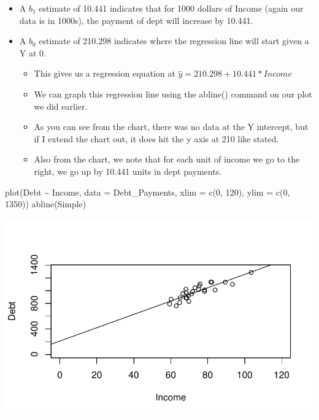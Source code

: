 \documentclass[
  letterpaper,
  DIV=11,
  numbers=noendperiod]{scrreprt}
\newenvironment{Shaded}{\begin{snugshade}}{\end{snugshade}}
\newcommand{\AttributeTok}[1]{\textcolor[rgb]{0.40,0.45,0.13}{#1}}
\newcommand{\DecValTok}[1]{\textcolor[rgb]{0.68,0.00,0.00}{#1}}
\newcommand{\FunctionTok}[1]{\textcolor[rgb]{0.28,0.35,0.67}{#1}}
\newcommand{\NormalTok}[1]{\textcolor[rgb]{0.00,0.23,0.31}{#1}}
\newcommand{\SpecialCharTok}[1]{\textcolor[rgb]{0.37,0.37,0.37}{#1}}
\providecommand{\tightlist}{%
  \setlength{\itemsep}{0pt}\setlength{\parskip}{0pt}}\usepackage{longtable,booktabs,array}
\begin{document}
\begin{itemize}
\tightlist
\item
  A \(b_1\) estimate of 10.441 indicates that for 1000 dollars of Income
  (again our data is in 1000s), the payment of dept will increase by
  10.441.
\item
  A \(b_0\) estimate of 210.298 indicates where the regression line will
  start given a Y at 0.

  \begin{itemize}
  \tightlist
  \item
    This gives us a regression equation at
    \(\hat{y} = 210.298 + 10.441*Income\)
  \item
    We can graph this regression line using the abline() command on our
    plot we did earlier.
  \item
    As you can see from the chart, there was no data at the Y intercept,
    but if I extend the chart out, it does hit the y axis at 210 like
    stated.
  \item
    Also from the chart, we note that for each unit of income we go to
    the right, we go up by 10.441 units in dept payments.
  \end{itemize}
\end{itemize}

\begin{Shaded}
\begin{Highlighting}[]
\FunctionTok{plot}\NormalTok{(Debt }\SpecialCharTok{\textasciitilde{}}\NormalTok{ Income, }\AttributeTok{data =}\NormalTok{ Debt\_Payments, }\AttributeTok{xlim =} \FunctionTok{c}\NormalTok{(}\DecValTok{0}\NormalTok{, }\DecValTok{120}\NormalTok{), }\AttributeTok{ylim =} \FunctionTok{c}\NormalTok{(}\DecValTok{0}\NormalTok{,}
    \DecValTok{1350}\NormalTok{))}
\FunctionTok{abline}\NormalTok{(Simple)}
\end{Highlighting}
\end{Shaded}

\includegraphics{regression_files/figure-pdf/unnamed-chunk-4-1.pdf}
\end{document}
